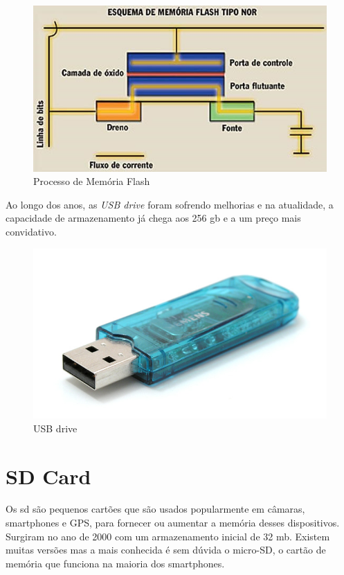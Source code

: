 \documentclass{report}
\begin{document}
	\begin{figure} [h]
		\centering
		\includegraphics[scale=0.4]{flash.jpg}
		\caption{Processo de Memória Flash}
	\end{figure}		 
		
		Ao longo dos anos, as \textit{USB drive} foram sofrendo melhorias e na atualidade, a capacidade de armazenamento já chega aos 256 \ac{gb} e a um preço mais convidativo.
		
	\begin{figure} [h]
		\centering
		\includegraphics[scale=0.3]{usb_drive.jpg}
		\caption{USB drive}
	\end{figure}		

\newpage
		
		\section{SD Card}
		
	Os \ac{sd} são pequenos cartões que são usados popularmente em câmaras, smartphones e GPS, para fornecer ou aumentar a memória desses dispositivos. Surgiram no ano de 2000 com um armazenamento inicial de 32 \ac{mb}. Existem muitas versões mas a mais conhecida é sem dúvida o micro-SD, o cartão de memória que funciona na maioria dos smartphones.
\vspace{1mm}
\end{document}
